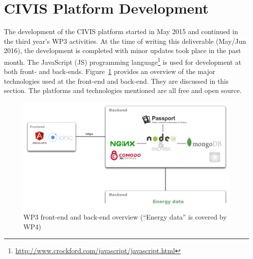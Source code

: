 \section{CIVIS Platform  Development} 
\label{sec:develop}
 
The development of the CIVIS platform started in May 2015 \citep{Huang2015c} and continued in the third year's WP3 activities. At the time of writing this deliverable (May/Jun 2016), the development is completed with minor updates took place in the past month.
% 
The JavaScript (JS) programming language\footnote{\url{http://www.crockford.com/javascript/javascript.html}} is used for development at both front- and back-ends. 
Figure~\ref{fig:ScreenShot2015-11-09at18} provides an overview of the major technologies used at the front-end and back-end. They are discussed in this section. 
The platforms and technologies mentioned are all free and open source. 

\begin{figure}[h!]
\centering
\includegraphics[width=0.9\linewidth]{img/tech}
\caption{WP3 front-end and back-end overview (``Energy data'' is covered by WP4)}
\label{fig:ScreenShot2015-11-09at18}
\end{figure}





